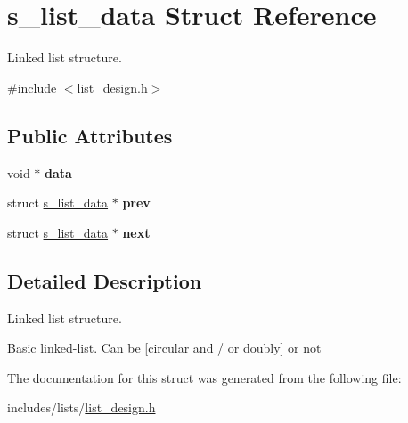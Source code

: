 \hypertarget{structs__list__data}{}\section{s\+\_\+list\+\_\+data Struct Reference}
\label{structs__list__data}


Linked list structure.  




{\ttfamily \#include $<$list\+\_\+design.\+h$>$}

\subsection*{Public Attributes}
\begin{DoxyCompactItemize}
\item 
void $\ast$ {\bfseries data}\hypertarget{structs__list__data_a3e65860cf1c820d1ed84c32521f69abb}{}\label{structs__list__data_a3e65860cf1c820d1ed84c32521f69abb}

\item 
struct \hyperlink{structs__list__data}{s\+\_\+list\+\_\+data} $\ast$ {\bfseries prev}\hypertarget{structs__list__data_ae14e85f430c9f942c3a847129e63d2fc}{}\label{structs__list__data_ae14e85f430c9f942c3a847129e63d2fc}

\item 
struct \hyperlink{structs__list__data}{s\+\_\+list\+\_\+data} $\ast$ {\bfseries next}\hypertarget{structs__list__data_a41f89e574a9a23806a167d366a79022f}{}\label{structs__list__data_a41f89e574a9a23806a167d366a79022f}

\end{DoxyCompactItemize}


\subsection{Detailed Description}
Linked list structure. 

Basic linked-\/list. Can be \mbox{[}circular and / or doubly\mbox{]} or not 

The documentation for this struct was generated from the following file\+:\begin{DoxyCompactItemize}
\item 
includes/lists/\hyperlink{list__design_8h}{list\+\_\+design.\+h}\end{DoxyCompactItemize}
